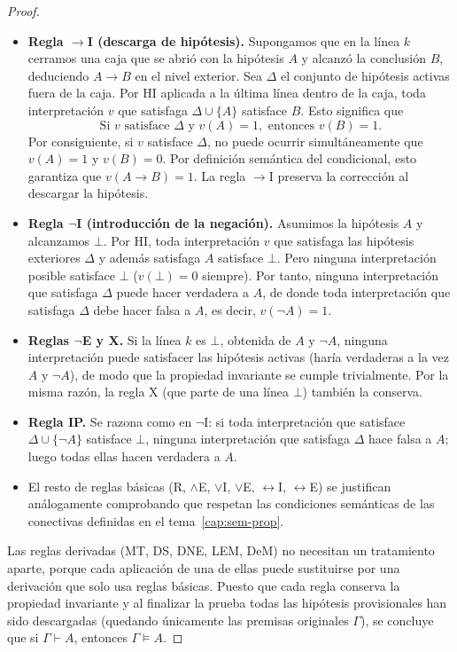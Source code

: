 \begin{proof}
\begin{itemize}
    \item \textbf{Regla $\to$I (descarga de hipótesis).} Supongamos
      que en la línea $k$ cerramos una caja que se abrió con la
      hipótesis $A$ y alcanzó la conclusión $B$, deduciendo $A \to B$
      en el nivel exterior. Sea $\Delta$ el conjunto de hipótesis
      activas fuera de la caja. Por HI aplicada a la última línea
      dentro de la caja, toda interpretación $v$ que satisfaga $\Delta \cup \{A\}$ satisface $B$. Esto significa que
    \[
    \text{Si } v \text{ satisface } \Delta \text{ y } v(A) = 1, \text{ entonces } v(B) = 1.
    \]
    Por consiguiente, si $v$ satisface $\Delta$, no puede ocurrir simultáneamente que $v(A) = 1$ y $v(B) = 0$. Por definición semántica del condicional, esto garantiza que $v(A \to B) = 1$. La regla $\to$I preserva la corrección al descargar la hipótesis.

    \item \textbf{Regla $\neg$I (introducción de la negación).}
      Asumimos la hipótesis $A$ y alcanzamos $\bot$. Por HI, toda
      interpretación $v$ que satisfaga las hipótesis exteriores
      $\Delta$ y además satisfaga $A$ satisface $\bot$. Pero
      ninguna interpretación posible satisface $\bot$ ($v(\bot) = 0$
      siempre). Por tanto, ninguna interpretación que satisfaga
      $\Delta$ puede hacer verdadera a $A$, de donde toda
      interpretación que satisfaga $\Delta$ debe hacer falsa a $A$, es
      decir, $v(\neg A) = 1$. 

    \item \textbf{Reglas $\neg$E y X.} Si la línea $k$ es $\bot$, obtenida de $A$ y $\neg A$, ninguna interpretación puede satisfacer las hipótesis activas (haría verdaderas a la vez $A$ y $\neg A$), de modo que la propiedad invariante se cumple trivialmente. Por la misma razón, la regla X (que parte de una línea $\bot$) también la conserva.

    \item \textbf{Regla IP.} Se razona como en $\neg$I: si toda interpretación que satisface $\Delta \cup \{\neg A\}$ satisface $\bot$, ninguna interpretación que satisfaga $\Delta$ hace falsa a $A$; luego todas ellas hacen verdadera a $A$.

    \item El resto de reglas básicas (R, $\land$E, $\lor$I, $\lor$E, $\leftrightarrow$I, $\leftrightarrow$E) se justifican análogamente comprobando que respetan las condiciones semánticas de las conectivas definidas en el tema~\ref{cap:sem-prop}.
\end{itemize}

Las reglas derivadas (MT, DS, DNE, LEM, DeM) no necesitan un tratamiento aparte, porque cada aplicación de una de ellas puede sustituirse por una derivación que solo usa reglas básicas. Puesto que cada regla conserva la propiedad invariante y al finalizar la prueba todas las hipótesis provisionales han sido descargadas (quedando únicamente las premisas originales $\Gamma$), se concluye que si $\Gamma \vdash A$, entonces $\Gamma \models A$.
\end{proof}

